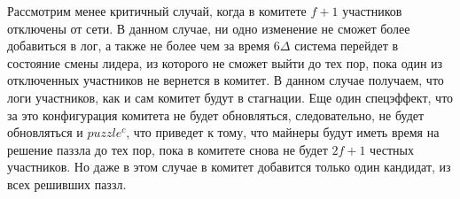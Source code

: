 Рассмотрим менее критичный случай, когда в комитете $f+1$ участников отключены от сети. В данном случае, ни одно изменение не сможет более добавиться в лог, а также не более чем за время $6\Delta$ система перейдет в состояние смены лидера, из которого не сможет выйти до тех пор, пока один из отключенных участников не вернется в комитет. В данном случае получаем, что логи участников, как и сам комитет будут в стагнации. Еще один спецэффект, что за это конфигурация комитета не будет обновляться, следовательно, не будет обновляться и $puzzle^c$, что приведет к тому, что майнеры будут иметь время на решение паззла до тех пор, пока в комитете снова не будет $2f+1$ честных участников. Но даже в этом случае в комитет добавится только один кандидат, из всех решивших паззл.